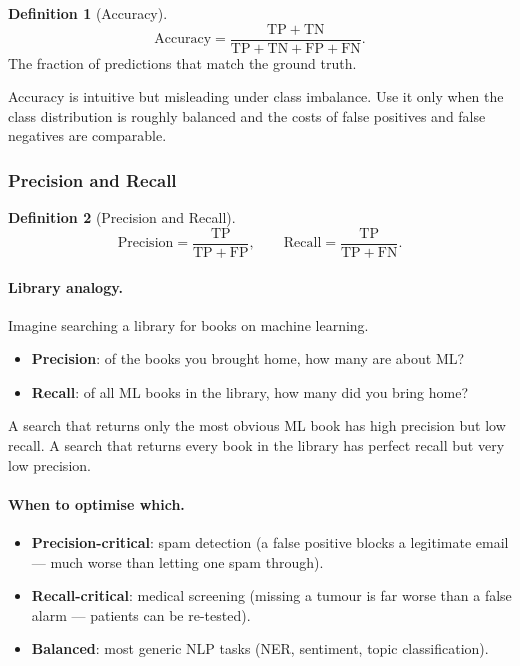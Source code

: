 \documentclass[12pt,a4paper]{report}
\theoremstyle{definition}
\newtheorem{definition}{Definition}[section]
\theoremstyle{remark}
\begin{document}
\begin{definition}[Accuracy]
\[ \mathrm{Accuracy} = \frac{\mathrm{TP} + \mathrm{TN}}{\mathrm{TP} + \mathrm{TN} + \mathrm{FP} + \mathrm{FN}}. \]
The fraction of predictions that match the ground truth.
\end{definition}

Accuracy is intuitive but misleading under class imbalance. Use it only when the class distribution is roughly balanced and the costs of false positives and false negatives are comparable.

\subsubsection*{Precision and Recall}

\begin{definition}[Precision and Recall]
\[ \mathrm{Precision} = \frac{\mathrm{TP}}{\mathrm{TP} + \mathrm{FP}}, \qquad \mathrm{Recall} = \frac{\mathrm{TP}}{\mathrm{TP} + \mathrm{FN}}. \]
\end{definition}

\paragraph{Library analogy.} Imagine searching a library for books on machine learning.
\begin{itemize}
    \item \textbf{Precision}: of the books you brought home, how many are about ML?
    \item \textbf{Recall}: of all ML books in the library, how many did you bring home?
\end{itemize}
A search that returns only the most obvious ML book has high precision but low recall. A search that returns every book in the library has perfect recall but very low precision.

\paragraph{When to optimise which.}
\begin{itemize}
    \item \textbf{Precision-critical}: spam detection (a false positive blocks a legitimate email --- much worse than letting one spam through).
    \item \textbf{Recall-critical}: medical screening (missing a tumour is far worse than a false alarm --- patients can be re-tested).
    \item \textbf{Balanced}: most generic NLP tasks (NER, sentiment, topic classification).
\end{itemize}
\end{document}
